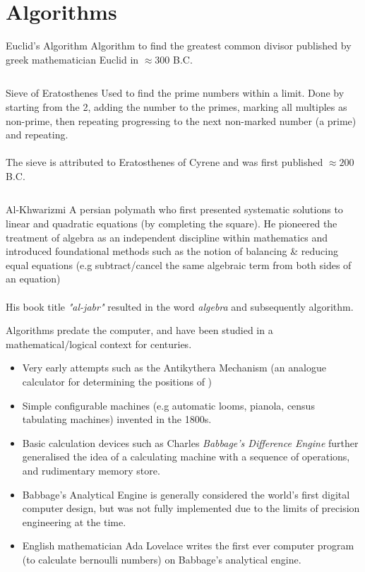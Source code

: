 \section{Algorithms}
\begin{sidenotebox}{Euclid's Algorithm}
    Algorithm to find the greatest common divisor published by greek mathematician Euclid in $\approx 300$ B.C.
    \inputminted{haskell}{introduction/code/euclid.hs} 
\end{sidenotebox}
\begin{sidenotebox}{Sieve of Eratosthenes}
    Used to find the prime numbers within a limit. Done by starting from the 2, adding the number to the primes, marking all multiples as non-prime, then repeating progressing to the next non-marked number (a prime) and repeating. 
    \\
    \\ The sieve is attributed to Eratosthenes of Cyrene and was first published $\approx 200$ B.C.
    \inputminted{haskell}{introduction/code/eratosthenes.hs}
\end{sidenotebox}
\begin{sidenotebox}{Al-Khwarizmi}
    A persian polymath who first presented  systematic solutions to linear and quadratic equations (by completing the square). 
    He pioneered the treatment of algebra as an independent discipline within mathematics and introduced foundational methods such as the notion of balancing \& reducing equal equations (e.g subtract/cancel the same algebraic term from both sides of an equation)
    \\
    \\ His book title  \textit{"al-jabr"}  resulted in the word \textit{algebra} and subsequently algorithm.   
\end{sidenotebox}

Algorithms predate the computer, and have been studied in a mathematical/logical context for centuries.
\begin{itemize}
    \item Very early attempts such as the Antikythera Mechanism (an analogue calculator for determining the positions of ) 
    \item Simple configurable machines (e.g automatic looms, pianola, census tabulating machines) invented in the 1800s.
    \item Basic calculation devices such as Charles \textit{Babbage's Difference Engine} further generalised the idea of a calculating machine with a sequence of operations, and rudimentary memory store.
    \item Babbage's Analytical Engine is generally considered the world's first digital computer design, but was not fully implemented due to the limits of precision engineering at the time.
    \item English mathematician Ada Lovelace writes the first ever computer program  (to calculate bernoulli numbers) on Babbage's analytical engine.
\end{itemize}

